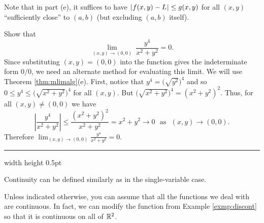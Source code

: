 Note that in part (e), it suffices to have $\lvert\mspace{1mu}f(x,y) - L\mspace{1mu}\rvert \le g(x,y)$ for all $(x,y)$ ``sufficiently
close'' to $(a,b)$ (but excluding $(a,b)$ itself).
\newpage
\begin{exmp}\label{exmp:discont}
 Show that
 \begin{displaymath}
  \lim_{(x,y) \to (0,0)}~ \frac{y^4}{x^2 + y^2} = 0.
 \end{displaymath}
 Since substituting $(x,y) = (0,0)$ into the function gives the indeterminate form $0/0$, we need an alternate
 method for evaluating this limit. We will use Theorem \ref{thm:mlimalg}(e). First, notice that
 $y^4 = \bigl( \sqrt{y^2} \bigr)^4$ and so $0 \le y^4 \le \bigl( \sqrt{x^2 + y^2} \bigr)^4$ for all $(x,y)$. But
 $\bigl( \sqrt{x^2 + y^2} \bigr)^4 = (x^2 + y^2)^2$. Thus, for all $(x,y) \ne (0,0)$ we have
 \begin{displaymath}
  \left| \frac{y^4}{x^2 + y^2} \right| \le \frac{(x^2 + y^2)^2}{x^2 + y^2} = x^2 + y^2 \rightarrow 0 \text{~~as~~}
  (x,y) \rightarrow (0,0).
 \end{displaymath}
 Therefore $\displaystyle\lim_{(x,y) \to (0,0)} \frac{y^4}{x^2 + y^2} = 0$.
\end{exmp}
\hrule width \textwidth height 0.5pt
\vspace{4mm}

Continuity can be defined similarly as in the single-variable case.


Unless indicated otherwise, you can assume that all the functions we deal with are continuous. In fact, we can
modify the function from Example \ref{exmp:discont} so that it is continuous on all of $\mathbb{R}^{2}$.


